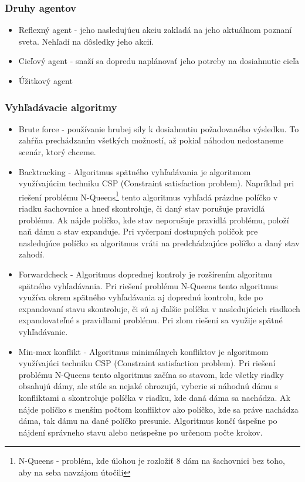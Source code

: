 \subsubsection{Druhy agentov}
\begin{itemize}
	\item Reflexný agent - jeho nasledujúcu akciu zakladá na jeho aktuálnom poznaní sveta. Nehľadí na dôsledky jeho akcií.
	\item Cieľový agent - snaží sa dopredu naplánovať jeho potreby na dosiahnutie cieľa 
	\item Úžitkový agent 
\end{itemize}
\subsubsection{Vyhľadávacie algoritmy}
\begin{itemize}
	\item Brute force - používanie hrubej sily k dosiahnutiu požadovaného výsledku. To zahŕňa prechádzaním všetkých možností, až pokiaľ náhodou nedostaneme scenár, ktorý chceme.\cite{bruteforce}
	\item Backtracking - Algoritmus spätného vyhľadávania je algoritmom využívajúcim techniku CSP (Constraint satisfaction problem). Napríklad pri riešení problému N-Queens\footnote{N-Queens - problém, kde úlohou je rozložiť 8 dám na šachovnici bez toho, aby na seba navzájom útočili} tento algoritmus vyhľadá prázdne políčko v riadku šachovnice a hneď skontroluje, či daný stav porušuje pravidlá problému. Ak nájde políčko, kde stav neporušuje pravidlá problému, položí naň dámu a stav expanduje. Pri vyčerpaní dostupných políčok pre nasledujúce políčko sa algoritmus vráti na predchádzajúce políčko a daný stav zahodí.\cite{backtracking}
	\item Forwardcheck - Algoritmus doprednej kontroly je rozšírením algoritmu spätného vyhľadávania. Pri riešení problému N-Queens tento algoritmus využíva okrem spätného vyhľadávania aj doprednú kontrolu, kde po expandovaní stavu skontroluje, či sú aj ďalšie políčka v nasledujúcich riadkoch expandovateľné s pravidlami problému. Pri zlom riešení sa využije spätné vyhľadávanie. \cite{forwardcheck}
	\item Min-max konflikt - Algoritmus minimálnych konfliktov je algoritmom využívajúci techniku CSP (Constraint satisfaction problem). Pri riešení problému N-Queens tento algoritmus začína so stavom, kde všetky riadky obsahujú dámy, ale stále sa nejaké ohrozujú, vyberie si náhodnú dámu s konfliktami a skontroluje políčka v riadku, kde daná dáma sa nachádza. Ak nájde políčko s menším počtom konfliktov ako políčko, kde sa práve nachádza dáma, tak dámu na dané políčko presunie. Algoritmus končí úspešne po nájdení správneho stavu alebo neúspešne po určenom počte krokov.\cite{minmax}
\end{itemize}
